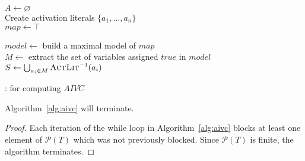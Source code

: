 \begin{algorithm}[t]
  \BlankLine
  $A \leftarrow \varnothing$\\
  Create activation literals $\{a_1, \ldots, a_n\}$ \\
  $map \leftarrow \top$ \\
  \BlankLine

   { \label{alg:aivc:checksat}
    $model \leftarrow $ build a maximal model of $map$  \label{alg:aivc:maxsat} \\
    $M \leftarrow$ extract the set of variables assigned $true$ in $model$ \label{alg:aivc:assignm}\\
    $S \leftarrow \bigcup_{a_i \in M} \textsc{ActLit} ^{-1}(a_i)$ \label{alg:aivc:assigns}\\
\BlankLine
  }
\caption{\aivcalg : for computing $AIVC$}
\label{alg:aivc}
\end{algorithm}


\begin{theorem}
\label{theorem:termination}
  Algorithm~\ref{alg:aivc} will terminate.
\end{theorem}
\begin{proof}
Each iteration of the while loop in Algorithm~\ref{alg:aivc} blocks at
least one element of $\mathcal{P}(T)$ which was not previously
blocked. Since $\mathcal{P}(T)$ is finite, the algorithm terminates.
\end{proof}

